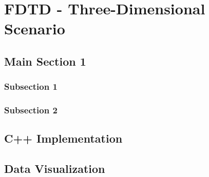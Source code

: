 
\chapter{FDTD - Three-Dimensional Scenario} %

\label{Chapter4} %


\section{Main Section 1}


\subsection{Subsection 1}



\subsection{Subsection 2}


\section{C++ Implementation}

\section{Data Visualization}

